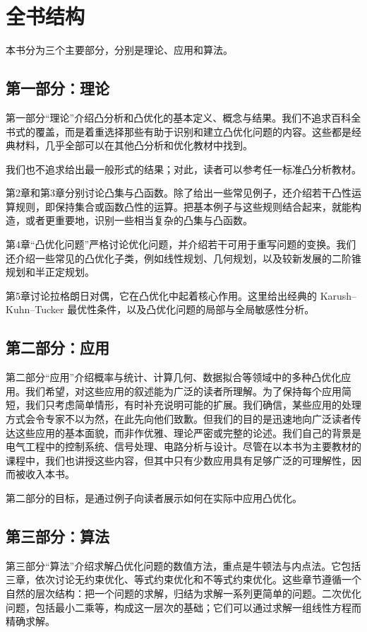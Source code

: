 \section{全书结构}
本书分为三个主要部分，分别是理论、应用和算法。

\subsection{第一部分：理论}
第一部分“理论”介绍凸分析和凸优化的基本定义、概念与结果。我们不追求百科全书式的覆盖，而是着重选择那些有助于识别和建立凸优化问题的内容。这些都是经典材料，几乎全部可以在其他凸分析和优化教材中找到。

我们也不追求给出最一般形式的结果；对此，读者可以参考任一标准凸分析教材。

第2章和第3章分别讨论凸集与凸函数。除了给出一些常见例子，还介绍若干凸性运算规则，即保持集合或函数凸性的运算。把基本例子与这些规则结合起来，就能构造，或者更重要地，识别一些相当复杂的凸集与凸函数。

第4章“凸优化问题”严格讨论优化问题，并介绍若干可用于重写问题的变换。我们还介绍一些常见的凸优化子类，例如线性规划、几何规划，以及较新发展的二阶锥规划和半正定规划。

第5章讨论拉格朗日对偶，它在凸优化中起着核心作用。这里给出经典的 Karush--Kuhn--Tucker 最优性条件，以及凸优化问题的局部与全局敏感性分析。

\subsection{第二部分：应用}
第二部分“应用”介绍概率与统计、计算几何、数据拟合等领域中的多种凸优化应用。我们希望，对这些应用的叙述能为广泛的读者所理解。为了保持每个应用简短，我们只考虑简单情形，有时补充说明可能的扩展。我们确信，某些应用的处理方式会令专家不以为然，在此先向他们致歉。但我们的目的是迅速地向广泛读者传达这些应用的基本面貌，而非作优雅、理论严密或完整的论述。我们自己的背景是电气工程中的控制系统、信号处理、电路分析与设计。尽管在以本书为主要教材的课程中，我们也讲授这些内容，但其中只有少数应用具有足够广泛的可理解性，因而被收入本书。

第二部分的目标，是通过例子向读者展示如何在实际中应用凸优化。

\subsection{第三部分：算法}
第三部分“算法”介绍求解凸优化问题的数值方法，重点是牛顿法与内点法。它包括三章，依次讨论无约束优化、等式约束优化和不等式约束优化。这些章节遵循一个自然的层次结构：把一个问题的求解，归结为求解一系列更简单的问题。二次优化问题，包括最小二乘等，构成这一层次的基础；它们可以通过求解一组线性方程而精确求解。


